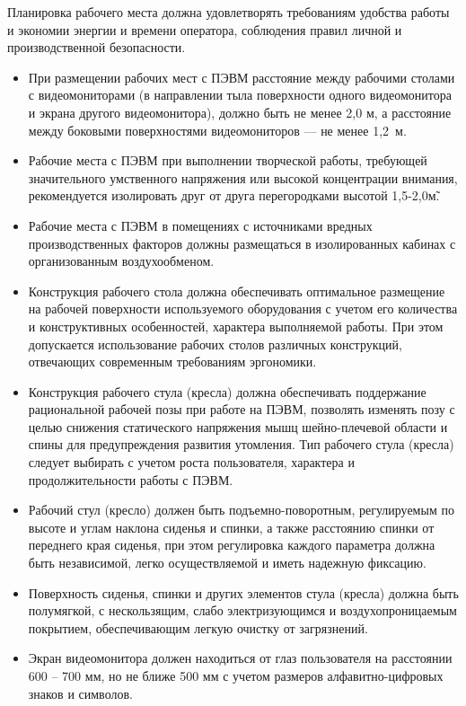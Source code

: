 Планировка рабочего места должна удовлетворять требованиям удобства работы и экономии энергии и времени оператора, соблюдения правил личной и производственной безопасности.
\begin{itemize}
  \item При размещении рабочих мест с ПЭВМ расстояние между рабочими столами с видеомониторами (в направлении тыла поверхности одного видеомонитора и экрана другого видеомонитора), должно быть не менее 2,0 м, а расстояние между боковыми поверхностями видеомониторов --- не менее 1,2~м.
  \item Рабочие места с ПЭВМ при выполнении творческой работы, требующей значительного умственного напряжения или высокой концентрации внимания, рекомендуется изолировать друг от друга перегородками высотой 1,5-2,0\~м.
  \item Рабочие места с ПЭВМ в помещениях с источниками вредных производственных факторов должны размещаться в изолированных кабинах с организованным воздухообменом.
  \item Конструкция рабочего стола должна обеспечивать оптимальное размещение на рабочей поверхности используемого оборудования с учетом его количества и конструктивных особенностей, характера выполняемой работы. При этом допускается использование рабочих столов различных конструкций, отвечающих современным требованиям эргономики.
  \item Конструкция рабочего стула (кресла) должна обеспечивать поддержание рациональной рабочей позы при работе на ПЭВМ, позволять изменять позу с целью снижения статического напряжения мышц шейно-плечевой области и спины для предупреждения развития утомления. Тип рабочего стула (кресла) следует выбирать с учетом роста пользователя, характера и продолжительности работы с ПЭВМ.
  \item Рабочий стул (кресло) должен быть подъемно-поворотным, регулируемым по высоте и углам наклона сиденья и спинки, а также расстоянию спинки от переднего края сиденья, при этом регулировка каждого параметра должна быть независимой, легко осуществляемой и иметь надежную фиксацию.
  \item Поверхность сиденья, спинки и других элементов стула (кресла) должна быть полумягкой, с нескользящим, слабо электризующимся и воздухопроницаемым покрытием, обеспечивающим легкую очистку от загрязнений.
  \item Экран видеомонитора должен находиться от глаз пользователя на расстоянии 600 -- 700 мм, но не ближе 500 мм с учетом размеров алфавитно-цифровых знаков и символов.
\end{itemize}
